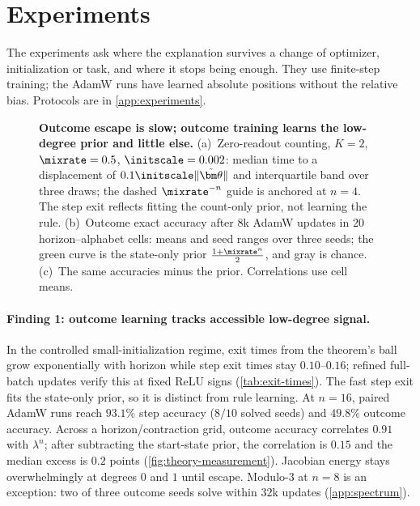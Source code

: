 \suppressfloats[t]
\section{Experiments}
\label{sec:experiments}
\label{sec:validation}

The experiments ask where the explanation survives a change of optimizer, initialization or task, and where it stops being enough.
They use finite-step training; the AdamW runs have learned absolute positions without the relative bias. Protocols are in \cref{app:experiments}.

\begin{figure}[t]
\centering
\resizebox{\linewidth}{!}{}
\caption{\textbf{Outcome escape is slow; outcome training learns the low-degree prior and little else.}
(a)~Zero-readout counting, $K=2$, $\mixrate=0.5$, $\initscale=0.002$: median time to a displacement of $0.1\initscale\|\tilde{\bm\theta}\|$ and interquartile band over three draws; the dashed $\mixrate^{-n}$ guide is anchored at $n=4$. The step exit reflects fitting the count-only prior, not learning the rule.
(b)~Outcome exact accuracy after $8$k AdamW updates in $20$ horizon--alphabet cells: means and seed ranges over three seeds; the green curve is the state-only prior $\frac{1+\mixrate^n}{2}$, and gray is chance.
(c)~The same accuracies minus the prior. Correlations use cell means.}
\label{fig:theory-measurement}
\label{fig:lambda-grid}
\end{figure}

\paragraph{Finding 1: outcome learning tracks accessible low-degree signal.}
In the controlled small-initialization regime, exit times from the theorem's ball grow
exponentially with horizon while step exit times stay $0.10$--$0.16$; refined full-batch
updates verify this at fixed ReLU signs (\cref{tab:exit-times}). The fast step exit fits
the state-only prior, so it is distinct from rule learning. At $n=16$, paired AdamW runs
reach $93.1\%$ step accuracy ($8/10$ solved seeds) and $49.8\%$ outcome accuracy.
Across a horizon/contraction grid, outcome accuracy correlates $0.91$ with $\lambda^n$;
after subtracting the start-state prior, the correlation is $0.15$ and the median excess
is $0.2$ points (\cref{fig:theory-measurement}). Jacobian energy stays overwhelmingly at
degrees $0$ and $1$ until escape. Modulo-$3$ at $n=8$ is an exception: two of three
outcome seeds solve within $32$k updates (\cref{app:spectrum}).

